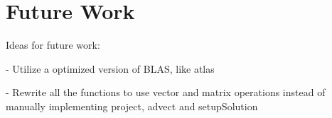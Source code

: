 \chapter{Future Work}

Ideas for future work:

 - Utilize a optimized version of BLAS, like atlas
 
 - Rewrite all the functions to use vector and matrix operations instead of manually implementing project, advect and setupSolution
